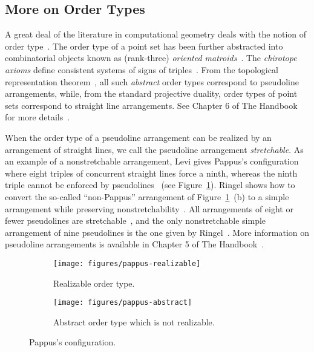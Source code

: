 \subsection{More on Order Types}%
\label{sec:history:pol:order-types}

A great deal of the literature in computational geometry deals with the notion
of order type~\cite{%
AAK02a,
AAK02b,
ACKLV16,
AKPV14,
AK01,
AK05,
AKMPW15,
AMP13,
Al86,
AILOW14,
BLSWZ93,
BMS01,
BRS92,
Epp18,
EHN99,
Fe96,
FV11,
FL78,
Go80,
GP83,
GP84,
GP86,
GP91,
GP93,
GPS89,
HM94,
HMMS11,
Knu92,
Le26,
MMIB12,
NV98,
Ri89,
RZ04,
Ri56,
St97%
}.
The order type of a point set has been further abstracted into combinatorial
objects known as (rank-three) \emph{oriented matroids}~\cite{FL78}. The
\emph{chirotope axioms} define consistent systems of signs of
triples~\cite{BLSWZ93}.
%
From the topological representation theorem~\cite{BMS01}, all such
\emph{abstract} order types correspond to pseudoline arrangements, while, from
the standard projective duality, order types of point sets correspond to
straight line arrangements. See Chapter 6 of The Handbook for more
details~\cite{RZ04}.

When the order type of a pseudoline arrangement can be realized by an
arrangement of straight lines, we call the pseudoline arrangement
\emph{stretchable}.
%
As an example of a nonstretchable arrangement, Levi gives Pappus's
configuration where eight triples of concurrent straight lines force a ninth,
whereas the ninth triple cannot be enforced by pseudolines~\cite{Le26} (see
Figure~\ref{fig:pappus}).
%
Ringel shows how to convert the so-called ``non-Pappus'' arrangement of
Figure~\ref{fig:pappus}~(b) to a simple arrangement while preserving
nonstretchability~\cite{Ri56}.
%
All arrangements of eight or fewer pseudolines are stretchable~\cite{GP80}, and
the only nonstretchable simple arrangement of nine pseudolines is the one given
by Ringel~\cite{Ri89}.
%
More information on pseudoline arrangements is available in Chapter 5 of The
Handbook~\cite{Goo04}.

\begin{figure}
	\centering{}
    \begin{subfigure}[t]{0.5\textwidth}
		\centering{}
		\texttt{[image: figures/pappus-realizable]}
		\caption{Realizable order type.}
    \end{subfigure}%
    \begin{subfigure}[t]{0.5\textwidth}
		\centering{}
		\texttt{[image: figures/pappus-abstract]}
		\caption{Abstract order type which is not realizable.}
    \end{subfigure}
	\caption{Pappus's configuration.}\label{fig:pappus}
\end{figure}

